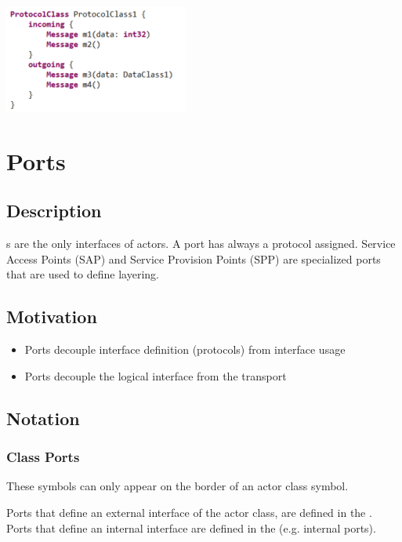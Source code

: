 \includegraphics{images/040-ProtocolClassTextualNotation.png}

\section{Ports}

\subsection{Description}

s are the only interfaces of actors. A port has always a protocol assigned. 
Service Access Points (SAP) and Service Provision Points (SPP) are specialized ports that are used to 
define layering.

\subsection{Motivation}

\begin{itemize}
\item Ports decouple interface definition (protocols) from interface usage
\item Ports decouple the logical interface from the transport 
\end{itemize}

\subsection{Notation}

\subsubsection{Class Ports}

These symbols can only appear on the border of an actor class symbol.

Ports that define an external interface of the actor class, are defined in the . Ports 
that define an internal interface are defined in the  (e.g. internal ports).

